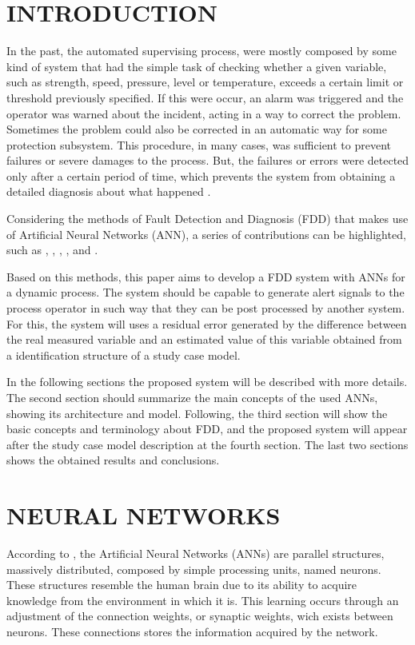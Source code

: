 \documentclass[10pt,fleqn,a4paper]{article}
\begin{document}
\section{INTRODUCTION}
In the past, the automated supervising process, were mostly composed by some
kind of system that had the simple task of checking whether a given variable,
such as strength, speed, pressure, level or temperature, exceeds a certain limit
or threshold previously specified. If this were occur, an alarm was triggered
and the operator was warned about the incident, acting in a way to correct the
problem. Sometimes the problem could also be corrected in an automatic way for
some protection subsystem. This procedure, in many cases, was sufficient to
prevent failures or severe damages to the process. But, the failures or
errors were detected only after a certain period of time, which prevents the
system from obtaining a detailed diagnosis about what happened
\citep{isermann:2006}.

Considering the methods of Fault Detection and Diagnosis (FDD) that makes use of
Artificial Neural Networks (ANN), a series of contributions can be highlighted,
such as \citet{vemuri:1998}, \citet{gao:2000}, \citet{chang:2003},
\citet{talebi:2005}, \citet{tian:2007} and \citet{jia-li:2010}.

Based on this methods, this paper aims to develop a FDD system with ANNs for a
dynamic process. The system should be capable to generate alert signals to the
process operator in such way that they can be post processed by another system.
For this, the system will uses a residual error generated by the difference
between the real measured variable and an estimated value of this variable
obtained from a identification structure of a study case model.

In the following sections the proposed system will be described with more
details. The second section should summarize the main concepts of the used ANNs,
showing its architecture and model. Following, the third section will show the
basic concepts and terminology about FDD, and the proposed system will appear
after the study case model description at the fourth section. The last two
sections shows the obtained results and conclusions.

\section{NEURAL NETWORKS}\label{sec:ann}
According to \citet{haykin:2000}, the Artificial Neural Networks (ANNs) are
parallel structures, massively distributed, composed by simple processing units,
named neurons. These structures resemble the human brain due to its ability to
acquire knowledge from the environment in which it is. This learning occurs
through an adjustment of the connection weights, or synaptic weights, wich
exists between neurons. These connections stores the information acquired by the
network.
\end{document}
